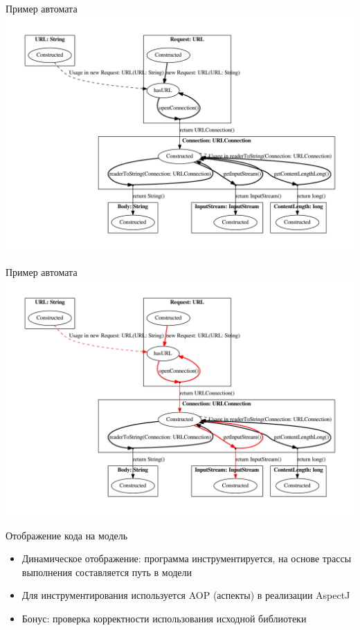 \documentclass[12pt]{beamer}
\begin{document}
\begin{frame}{Пример автомата}
	\includegraphics[width=\textwidth]{java.pdf}
\end{frame}

\begin{frame}{Пример автомата}
	\includegraphics[width=\textwidth]{extracted_java.pdf}
\end{frame}

\begin{frame}[fragile]{Отображение кода на модель}
  \begin{mybox}[]
  \begin{itemize}
  	\item Динамическое отображение: программа инструментируется, на основе трассы выполнения составляется путь в модели
  	\item Для инструментирования используется AOP (аспекты) в реализации AspectJ
  	\item Бонус: проверка корректности использования исходной библиотеки
  \end{itemize}
  \end{mybox}
\end{frame}
\end{document}
